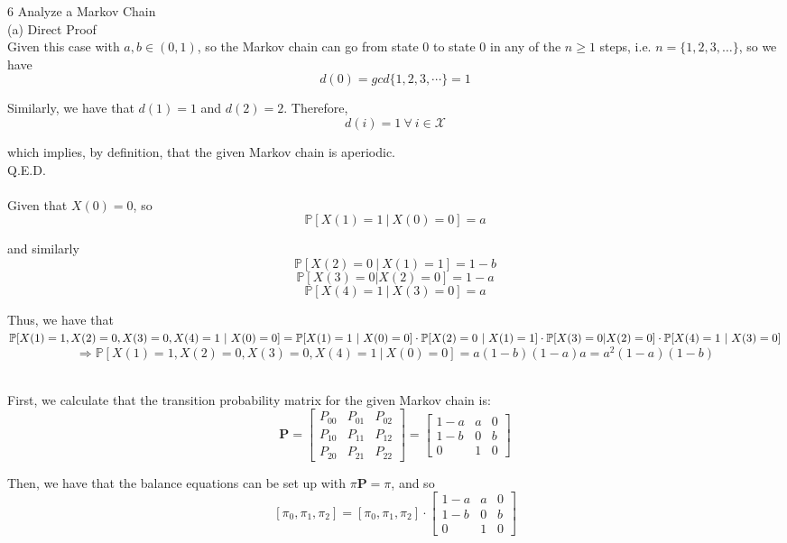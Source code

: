 \documentclass{article}
\begin{document}
{\Large 6 Analyze a Markov Chain} \\[.5cm]
{\color{red} (a) Direct Proof } \\

Given this case with $a, b \in (0,1)$, so the Markov chain can go from state 0 to state 0 in any of the $n\geq1$ steps, i.e. $n = \{1,2,3,\dots\}$, so we have
$$d(0) = gcd\{1,2,3,\cdots\} = 1$$

Similarly, we have that $d(1) = 1$ and $d(2) = 2$. Therefore,
$$d(i) = 1\ \forall\ i\in\mathscr{X}$$

which implies, by definition, that the given Markov chain is aperiodic. \\

Q.E.D. \\



 \\

Given that $X(0) = 0$, so
$$\mathbb{P}[X(1)=1\ |\ X(0)=0] = a$$

and similarly
$$\mathbb{P}[X(2)=0\ |\ X(1)=1] = 1-b $$
$$\mathbb{P}[X(3)=0 | X(2)=0] = 1-a $$
$$\mathbb{P}[X(4)=1\ |\ X(3)=0] = a $$

Thus, we have that
$\mathbb{P}[X(1)=1,X(2)=0,X(3)=0,X(4)=1\ |\ X(0) = 0] = \\
\mathbb{P}[X(1)=1\ |\ X(0)=0] \cdot
	\mathbb{P}[X(2)=0\ |\ X(1)=1] \cdot
	\mathbb{P}[X(3)=0 | X(2)=0] \cdot
	\mathbb{P}[X(4)=1\ |\ X(3)=0]$
$$\Longrightarrow
\mathbb{P}[X(1)=1,X(2)=0,X(3)=0,X(4)=1\ |\ X(0) = 0] =
a(1-b)(1-a)a = a^2(1-a)(1-b)$$



 \\

First, we calculate that the transition probability matrix for the given Markov chain is:
$$ \mathbf{P} =
\begin{bmatrix}
	P_{00} & P_{01} & P_{02} \\
	P_{10} & P_{11} & P_{12} \\
	P_{20} & P_{21} & P_{22}
\end{bmatrix} =
\begin{bmatrix}
	1-a & a & 0 \\
	1-b & 0 & b \\
	0 & 1 & 0
\end{bmatrix} $$

Then, we have that the balance equations can be set up with $\pi\mathbf{P} = \pi$, and so
$$[\pi_0, \pi_1, \pi_2] = [\pi_0, \pi_1, \pi_2] \cdot
\begin{bmatrix}
	1-a & a & 0 \\
	1-b & 0 & b \\
	0 & 1 & 0
\end{bmatrix} $$
\end{document}
